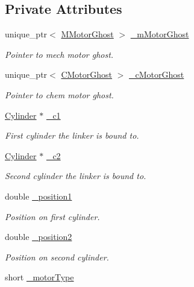 \subsection*{Private Attributes}
\begin{DoxyCompactItemize}
\item 
unique\+\_\+ptr$<$ \hyperlink{classMMotorGhost}{M\+Motor\+Ghost} $>$ \hyperlink{classMotorGhost_a651509682f0faffe9b8e2d77e652312b}{\+\_\+m\+Motor\+Ghost}
\begin{DoxyCompactList}\small\item\em Pointer to mech motor ghost. \end{DoxyCompactList}\item 
unique\+\_\+ptr$<$ \hyperlink{classCMotorGhost}{C\+Motor\+Ghost} $>$ \hyperlink{classMotorGhost_a9e16cc127c973fe3c8e559daa5922e97}{\+\_\+c\+Motor\+Ghost}
\begin{DoxyCompactList}\small\item\em Pointer to chem motor ghost. \end{DoxyCompactList}\item 
\hyperlink{classCylinder}{Cylinder} $\ast$ \hyperlink{classMotorGhost_a0725de6b61fc0eaaa50bf0cb33f933dc}{\+\_\+c1}
\begin{DoxyCompactList}\small\item\em First cylinder the linker is bound to. \end{DoxyCompactList}\item 
\hyperlink{classCylinder}{Cylinder} $\ast$ \hyperlink{classMotorGhost_a0d7606f2ce76db16bb10829fd92a971b}{\+\_\+c2}
\begin{DoxyCompactList}\small\item\em Second cylinder the linker is bound to. \end{DoxyCompactList}\item 
double \hyperlink{classMotorGhost_a94bcda46aa9e2bc0b53ec33fc7e38c3f}{\+\_\+position1}
\begin{DoxyCompactList}\small\item\em Position on first cylinder. \end{DoxyCompactList}\item 
double \hyperlink{classMotorGhost_a1f5b96676836599c4b43b98a4aebe556}{\+\_\+position2}
\begin{DoxyCompactList}\small\item\em Position on second cylinder. \end{DoxyCompactList}\item 
short \hyperlink{classMotorGhost_aadd08ee5f5ab0bf5402da7ebc65d8375}{\+\_\+motor\+Type}

\end{DoxyCompactItemize}

